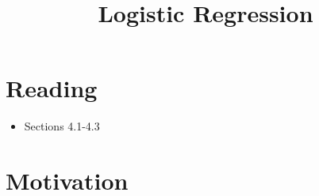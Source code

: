 


\title{Logistic Regression}

\maketitle
\tableofcontents

\section{Reading}
\begin{itemize}
\item Sections 4.1-4.3 \cite{islp}
\end{itemize}


\section{Motivation}

